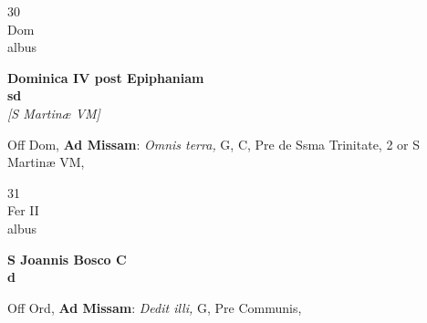 \documentclass[10pt, openany]{book}
\begin{document}
        \begin{center}
            \begin{minipage}{3.5in}
                \vspace{2em}
                \begin{minipage}{0.5in}
                    {\Huge 30} \\
                    {\normalsize Dom} \\
                    {\normalsize albus}
                \end{minipage}
                \begin{minipage}{3.0in}
                    \textbf{ \large Dominica IV post Epiphaniam \\
                    \textnormal{\normalsize sd}} \\ \textit{[S Martinæ VM]} \\ 
                \end{minipage}
                \begin{justify}Off Dom, \textbf{Ad Missam}: \textit{Omnis terra,} G, C, Pre de Ssma Trinitate, 2 or S Martinæ VM,  
                \end{justify}
            \end{minipage}
        \end{center}
    
        \begin{center}
            \begin{minipage}{3.5in}
                \vspace{2em}
                \begin{minipage}{0.5in}
                    {\Huge 31} \\
                    {\normalsize Fer II} \\
                    {\normalsize albus}
                \end{minipage}
                \begin{minipage}{3.0in}
                    \textbf{ \large S Joannis Bosco C \\
                    \textnormal{\normalsize d}} \\ 
                \end{minipage}
                \begin{justify}Off Ord, \textbf{Ad Missam}: \textit{Dedit illi,} G, Pre Communis,  
                \end{justify}
            \end{minipage}
        \end{center}
    
\end{document}
